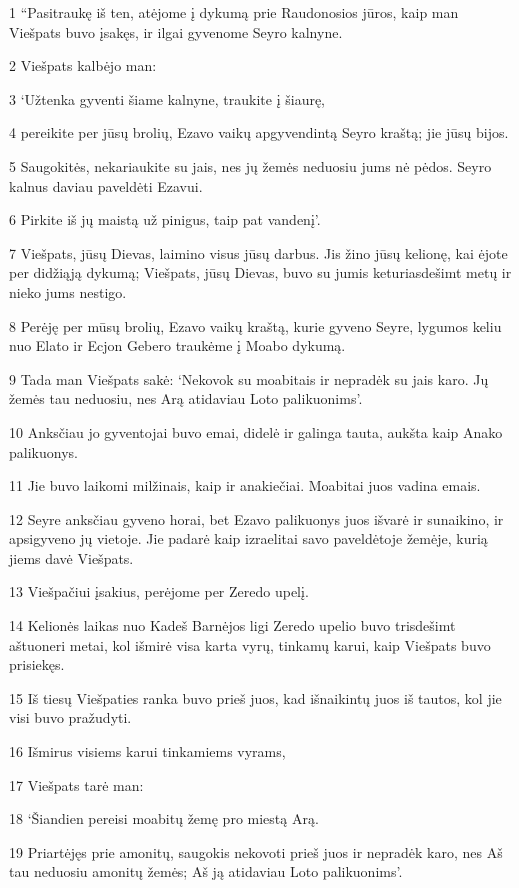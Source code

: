 \par 1 “Pasitraukę iš ten, atėjome į dykumą prie Raudonosios jūros, kaip man Viešpats buvo įsakęs, ir ilgai gyvenome Seyro kalnyne. 
\par 2 Viešpats kalbėjo man: 
\par 3 ‘Užtenka gyventi šiame kalnyne, traukite į šiaurę, 
\par 4 pereikite per jūsų brolių, Ezavo vaikų apgyvendintą Seyro kraštą; jie jūsų bijos. 
\par 5 Saugokitės, nekariaukite su jais, nes jų žemės neduosiu jums nė pėdos. Seyro kalnus daviau paveldėti Ezavui. 
\par 6 Pirkite iš jų maistą už pinigus, taip pat vandenį’. 
\par 7 Viešpats, jūsų Dievas, laimino visus jūsų darbus. Jis žino jūsų kelionę, kai ėjote per didžiąją dykumą; Viešpats, jūsų Dievas, buvo su jumis keturiasdešimt metų ir nieko jums nestigo. 
\par 8 Perėję per mūsų brolių, Ezavo vaikų kraštą, kurie gyveno Seyre, lygumos keliu nuo Elato ir Ecjon Gebero traukėme į Moabo dykumą. 
\par 9 Tada man Viešpats sakė: ‘Nekovok su moabitais ir nepradėk su jais karo. Jų žemės tau neduosiu, nes Arą atidaviau Loto palikuonims’. 
\par 10 Anksčiau jo gyventojai buvo emai, didelė ir galinga tauta, aukšta kaip Anako palikuonys. 
\par 11 Jie buvo laikomi milžinais, kaip ir anakiečiai. Moabitai juos vadina emais. 
\par 12 Seyre anksčiau gyveno horai, bet Ezavo palikuonys juos išvarė ir sunaikino, ir apsigyveno jų vietoje. Jie padarė kaip izraelitai savo paveldėtoje žemėje, kurią jiems davė Viešpats. 
\par 13 Viešpačiui įsakius, perėjome per Zeredo upelį. 
\par 14 Kelionės laikas nuo Kadeš Barnėjos ligi Zeredo upelio buvo trisdešimt aštuoneri metai, kol išmirė visa karta vyrų, tinkamų karui, kaip Viešpats buvo prisiekęs. 
\par 15 Iš tiesų Viešpaties ranka buvo prieš juos, kad išnaikintų juos iš tautos, kol jie visi buvo pražudyti. 
\par 16 Išmirus visiems karui tinkamiems vyrams, 
\par 17 Viešpats tarė man: 
\par 18 ‘Šiandien pereisi moabitų žemę pro miestą Arą. 
\par 19 Priartėjęs prie amonitų, saugokis nekovoti prieš juos ir nepradėk karo, nes Aš tau neduosiu amonitų žemės; Aš ją atidaviau Loto palikuonims’. 
